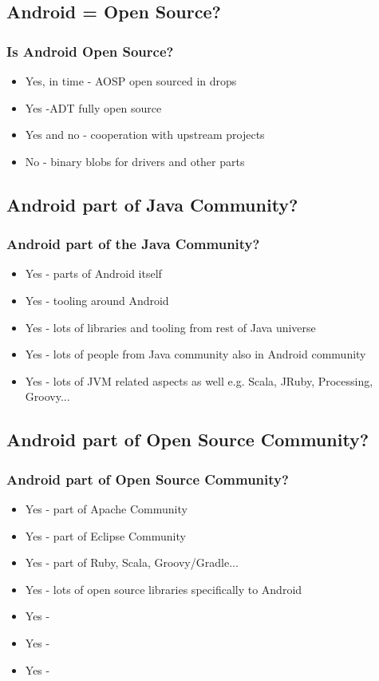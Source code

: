 \documentclass{beamer}
\begin{document}
  \subsection{Android = Open Source?}
    \begin{frame}
      \frametitle{Is Android Open Source?}
      \begin{itemize}
       \item<1-> Yes, in time - AOSP open sourced in drops
       \item<2-> Yes -ADT fully open source
       \item<3-> Yes and no - cooperation with upstream projects
       \item<4-> No - binary blobs for drivers and other parts
      \end{itemize}
    \end{frame}

  \subsection{Android part of Java Community?}
    \begin{frame}
     \frametitle{Android part of the Java Community?}
     \begin{itemize}
      \item<1-> Yes - parts of Android itself
      \item<2-> Yes - tooling around Android
      \item<3-> Yes - lots of libraries and tooling from rest of Java universe
      \item<4-> Yes - lots of people from Java community also in Android community
      \item<5-> Yes - lots of JVM related aspects as well e.g. Scala, JRuby, Processing, Groovy...
      \end{itemize}
    \end{frame}
  
  \subsection{Android part of Open Source Community?}
    \begin{frame}
     \frametitle{Android part of Open Source Community?}
     \begin{itemize}
      \item<1-> Yes - part of Apache Community
      \item<2-> Yes - part of Eclipse Community
      \item<3-> Yes - part of Ruby, Scala, Groovy/Gradle...
      \item<4-> Yes - lots of open source libraries specifically to Android
      \item<5-> Yes - 
      \item<6-> Yes - 
      \item<7-> Yes - 
     \end{itemize}
    \end{frame}
\end{document}
